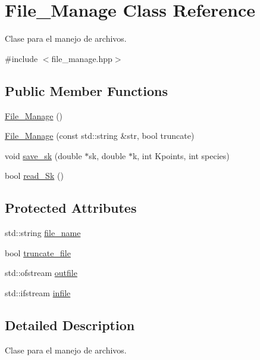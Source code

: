 \hypertarget{class_file___manage}{}\section{File\+\_\+\+Manage Class Reference}
\label{class_file___manage}


Clase para el manejo de archivos.  




{\ttfamily \#include $<$file\+\_\+manage.\+hpp$>$}

\subsection*{Public Member Functions}
\begin{DoxyCompactItemize}
\item 
\hyperlink{class_file___manage_abc8dc9e06400e1b1e67a8d9dddef4393}{File\+\_\+\+Manage} ()
\item 
\hyperlink{class_file___manage_a0315b0bb47c3572e17978b367aef66b9}{File\+\_\+\+Manage} (const std\+::string \&str, bool truncate)
\item 
void \hyperlink{class_file___manage_a994b1789f2e06c194cd9e50c708197cd}{save\+\_\+sk} (double $\ast$sk, double $\ast$k, int Kpoints, int species)
\item 
bool \hyperlink{class_file___manage_a1e38c35a55c0ed0d5323a93e8aa2ef97}{read\+\_\+\+Sk} ()
\end{DoxyCompactItemize}
\subsection*{Protected Attributes}
\begin{DoxyCompactItemize}
\item 
std\+::string \hyperlink{class_file___manage_a34a7f1a17609e115811efc140a07a018}{file\+\_\+name}
\item 
bool \hyperlink{class_file___manage_a598d159493673c0864cd0873816f33a8}{truncate\+\_\+file}
\item 
std\+::ofstream \hyperlink{class_file___manage_ab1ba9c8b82239cec993eff15781ec0be}{outfile}
\item 
std\+::ifstream \hyperlink{class_file___manage_a8c530b8325a65e290ea3db405f91234a}{infile}
\end{DoxyCompactItemize}


\subsection{Detailed Description}
Clase para el manejo de archivos. 


